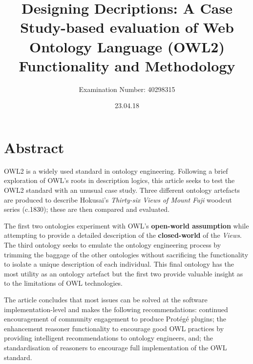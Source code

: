 \documentclass[titlepage,a4paper,12pt,oneside]{book}
\title{\textbf{Designing Decriptions: A Case Study-based evaluation of Web Ontology Language (OWL2) Functionality and Methodology}}
\author{Examination Number: 40298315}
\affil{School of Computing}
\affil{Edinburgh Napier}
\date{23.04.18}
\begin{document}
\maketitle

\chapter*{Abstract}
OWL2 is a widely used standard in ontology engineering.
Following a brief exploration of OWL's roots in description logics, this article seeks to test the OWL2 standard with an unusual case study.
Three different ontology artefacts are produced to describe Hokusai's \textit{Thirty-six Views of Mount Fuji} woodcut series (c.1830); these are then compared and evaluated.\par
The first two ontologies experiment with OWL's \textbf{open-world assumption} while attempting to provide a detailed description of the \textbf{closed-world} of the \textit{Views}.
The third ontology seeks to emulate the ontology engineering process by trimming the baggage of the other ontologies without sacrificing the functionality to isolate a unique description of each individual.
This final ontology has the most utility as an ontology artefact but the first two provide valuable insight as to the limitations of OWL technologies.\par
The article concludes that most issues can be solved at the software implementation-level and makes the following recommendations: continued encouragement of community engagement to produce Protégé plugins; the enhancement reasoner functionality to encourage good OWL practices by providing intelligent recommendations to ontology engineers, and; the standardisation of reasoners to encourage full implementation of the OWL standard.

\tableofcontents
\end{document}
